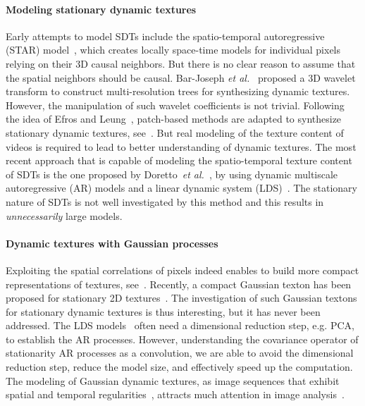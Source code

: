 \paragraph{Modeling stationary dynamic textures}
Early attempts to model SDTs include the spatio-temporal autoregressive (STAR) model~\cite{Szummer96a}, which creates locally space-time models for individual pixels relying on their 3D causal neighbors. But there is no clear reason to assume that the spatial neighbors should be causal.
Bar-Joseph {\it et al.}~\cite{Bar-joseph01texturemixing} proposed a 3D wavelet transform to construct multi-resolution trees for synthesizing dynamic textures. However, the manipulation of such wavelet coefficients is not trivial. Following the idea of Efros and Leung~\cite{Efros99texturesynthesis}, patch-based methods are adapted to synthesize stationary dynamic textures, see~\cite{WeiLevoy,Kwatra2003}. But real modeling of the texture content of videos is required to lead to better understanding of dynamic textures.
The most recent approach that is capable of modeling the spatio-temporal texture content of SDTs is the one proposed by Doretto~{\it et al.}~\cite{Doretto04spatiallyhomogeneous}, by using dynamic multiscale autoregressive (AR) models and a linear dynamic system (LDS)~\cite{dorettoCWS03ijcv}. The stationary nature of SDTs is not well investigated by this method and this results in \emph{unnecessarily} large models.

\paragraph{Dynamic textures with Gaussian processes}
Exploiting the spatial correlations of pixels indeed enables to build more compact representations of textures, see~\cite{Szummer96a,portilla-parametric-model,Wang04analysisand}. Recently, a compact Gaussian texton has been proposed for stationary 2D textures~\cite{Desolneux2011}. The investigation of such Gaussian textons for stationary dynamic textures is thus interesting, but it has never been addressed. The LDS models~\cite{Doretto04spatiallyhomogeneous} often need a dimensional reduction step, e.g. PCA, to establish the AR processes. However, understanding the covariance operator of stationarity AR processes as a convolution, we are able to avoid the dimensional reduction step, reduce the model size, and effectively speed up the computation.
The modeling of Gaussian dynamic textures, as image sequences that exhibit spatial and temporal regularities~\cite{Szummer96a,dorettoCWS03ijcv}, attracts much attention in image analysis~\cite{Szummer96a,dorettoCWS03ijcv,Bar-joseph01texturemixing,Costantini2008,peyre-mapmo-09}.

